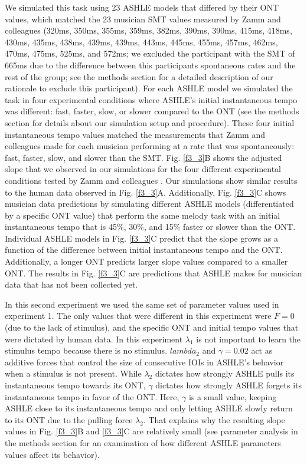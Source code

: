 \documentclass{report}
\begin{document}
We simulated this task using 23 ASHLE models that differed by their ONT values, which matched the 23 musician SMT values measured by Zamm and colleagues \cite{zamm2018musicians} (320ms, 350ms, 355ms, 359ms, 382ms, 390ms, 390ms, 415ms, 418ms, 430ms, 435ms, 438ms, 439ms, 439ms, 443ms, 445ms, 455ms, 457ms, 462ms, 470ms, 475ms, 525ms, and 572ms; we excluded the participant with the SMT of 665ms due to the difference between this participants spontaneous rates and the rest of the group; see the methods section for a detailed description of our rationale to exclude this participant). For each ASHLE model we simulated the task in four experimental conditions where ASHLE's initial instantaneous tempo was different: fast, faster, slow, or slower compared to the ONT (see the methods section for details about our simulation setup and procedure). These four initial instantaneous tempo values matched the measurements that Zamm and colleagues \cite{zamm2018musicians} made for each musician performing at a rate that was spontaneously: fast, faster, slow, and slower than the SMT. Fig.{} \ref{f3_3}B shows the adjusted slope that we observed in our simulations for the four different experimental conditions tested by Zamm and colleagues \cite{zamm2018musicians}. Our simulations show similar results to the human data observed in Fig.{} \ref{f3_3}A. Additionally, Fig.{} \ref{f3_3}C shows musician data predictions by simulating different ASHLE models (differentiated by a specific ONT value) that perform the same melody task with an initial instantaneous tempo that is 45\%, 30\%, and 15\% faster or slower than the ONT. Individual ASHLE models in Fig.{} \ref{f3_3}C predict that the slope grows as a function of the difference between initial instantaneous tempo and the ONT. Additionally, a longer ONT predicts larger slope values compared to a smaller ONT. The results in Fig.{} \ref{f3_3}C are predictions that ASHLE makes for musician data that has not been collected yet.

In this second experiment we used the same set of parameter values used in experiment 1. The only values that were different in this experiment were $F = 0$ (due to the lack of stimulus), and the specific ONT and initial tempo values that were dictated by human data. In this experiment $\lambda_1$ is not important to learn the stimulus tempo because there is no stimulus. $lambda_2$ and $\gamma = 0.02$ act as additive forces that control the size of consecutive IOIs in ASHLE's behavior when a stimulus is not present. While $\lambda_2$ dictates how strongly ASHLE pulls its instantaneous tempo towards its ONT, $\gamma$ dictates how strongly ASHLE forgets its instantaneous tempo in favor of the ONT. Here, $\gamma$ is a small value, keeping ASHLE close to its instantaneous tempo and only letting ASHLE slowly return to its ONT due to the pulling force $\lambda_2$. That explains why the resulting slope values in Fig.{} \ref{f3_3}B and \ref{f3_3}C are relatively small (see parameter analysis in the methods section for an examination of how different ASHLE parameters values affect its behavior).
\end{document}
